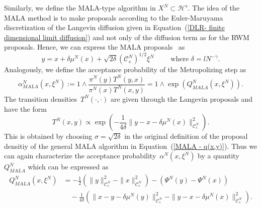 Similarly, we define the MALA-type algorithm in $X^N \subset \mathcal{H}^s$. The idea of the MALA method is to make proposals according to the Euler-Maruyama discretization of the Langevin diffusion given in Equation~(\ref{DLR- finite dimensional limit diffusion}) and not only of the diffusion term as for the RWM proposals. Hence, we can express the MALA proposals~\autocite[Equation~(2.17)]{Pillai2012} as
\begin{equation}
\label{DLR-Setting: Definiton MALA-proposal}
 y = x + \delta \mu^N(x) + \sqrt{2 \delta} (\mathcal{C}_s^{N})^{1/2} \xi^{N} \qquad \text{ where } \delta = l N^{-\gamma}.
\end{equation}
Analogously, we define the acceptance probability of the Metropolizing step as
\begin{equation}
 \label{DLR-Setting: Definition acceptance proba MALA}
 \alpha^N_{MALA}(x, \xi^N) := 1 \wedge \frac{\pi^N(y)T^N(y,x)}{\pi^N(x)T^N(x,y)} = 1 \wedge \exp (Q^N_{MALA}(x, \xi^N) ).
\end{equation}
The transition densities~$T^N(\cdot, \cdot)$ are given through the Langevin proposals and have the form
\begin{equation*}
 T^N (x,y) \varpropto \exp \left( - \frac{1}{4 \delta} \| y-x- \delta \mu^N(x) \|_{\mathcal{C}_s^N}^2 \right).
\end{equation*}
This is obtained by choosing $\sigma = \sqrt{2\delta} $ in the original definition of the proposal densitiy of the general MALA algorithm in Equation~(\ref{MALA - q(x,y)}). Thus we can again characterize the acceptance probability~$\alpha^N(x,\xi^N)$ by a quantity $Q^N_{MALA}$ which can be expressed as
\begin{equation}
 \label{DLR-Setting: Definition Q MALA}
 \begin{split}
  Q_{MALA}^{N}(x, \xi^{N}) & = - \frac{1}{2} \left(\| y \|_{\mathcal{C}_s^N}^2 - \| x \|_{\mathcal{C}_s^N}^2\right) - \left( \Psi^N(y) - \Psi^N(x) \right) \\
  & \quad - \frac{1}{4 \delta} \left( \| x - y - \delta \mu^N(y) \|_{\mathcal{C}_s^N}^2 -  \| y - x - \delta \mu^N(x) \|_{\mathcal{C}_s^N}^2 \right).
 \end{split}
\end{equation}

